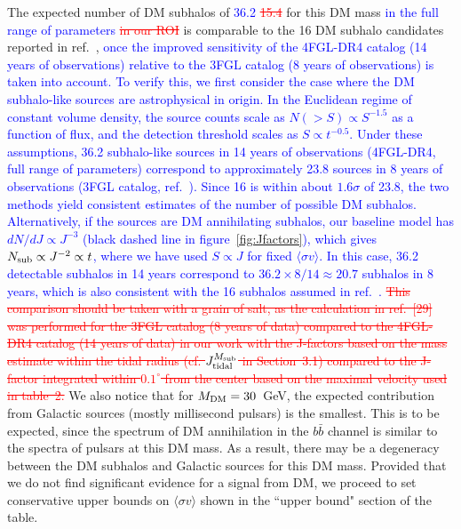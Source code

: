 \documentclass[12pt, a4paper]{article}
\newcommand{\new}[1]{\textcolor{blue}{#1}}
\newcommand{\old}[1]{\textcolor{red}{\st{#1}}}
\newcommand{\sigmav}{\langle \sigma v \rangle}
\newcommand{\Msub}{M_{\rm sub}}
\newcommand{\mdm}{{M_{\rm DM}}}
\begin{document}
The expected number of DM subhalos of \new{36.2} \old{15.4} for this DM mass \new{in the full range of parameters} \old{in our ROI} is comparable to the 16 DM subhalo candidates reported in ref.~\cite{2019JCAP...07..020C},
\new{once the improved sensitivity of the 4FGL-DR4 catalog (14 years of observations) relative to the 3FGL catalog (8 years of observations) is taken into account.}
\new{
To verify this, we first consider the case where the DM subhalo-like sources are astrophysical in origin. In the Euclidean regime of constant volume density, the source counts scale as $N(> S) \propto S^{-1.5}$ as a function of flux, and the detection threshold scales as $S \propto t^{-0.5}$. Under these assumptions, 36.2 subhalo-like sources in 14 years of observations (4FGL-DR4, full range of parameters) correspond to approximately 23.8 sources in 8 years of observations (3FGL catalog, ref.~\cite{2019JCAP...07..020C}).
Since 16 is within about $1.6\sigma$ of 23.8, the two methods yield consistent estimates of the number of possible DM subhalos.}
\new{Alternatively, if the sources are DM annihilating subhalos, our baseline model has $dN/dJ \propto J^{-3}$ (black dashed line in figure~\ref{fig:Jfactors}), which gives $N_{\rm sub} \propto J^{-2} \propto t$, where we have used $S \propto J$ for fixed $\sigmav$.
In this case, 36.2 detectable subhalos in 14 years correspond to $36.2 \times 8 / 14 \approx 20.7$ subhalos in 8 years, which is also consistent with the 16 subhalos assumed in ref.~\cite{2019JCAP...07..020C}.
}
\old{
This comparison should be taken with a grain of salt, as the calculation in ref.~[29] was performed for the 3FGL catalog (8 years of data) compared to the 4FGL-DR4 catalog (14 years of data) in our work with the J-factors based on the mass estimate within the tidal radius (cf. $J_{\rm tidal}^{\Msub}$ in Section~3.1) compared to the J-factor integrated within $0.1^\circ$ from the center based on the maximal velocity used in table~2.}
{We also notice that for $\mdm = 30$~GeV},  the expected contribution from Galactic sources (mostly millisecond pulsars) is the smallest.
This is to be expected, since the spectrum of DM annihilation in the $b\bar{b}$ channel is similar to the spectra of pulsars at this DM mass.
As a result, there may be a degeneracy between the DM subhalos and Galactic sources for this DM mass.
Provided that we do not find significant evidence for a signal from DM, we proceed to set conservative upper bounds on $\sigmav$ shown in the ``upper bound" section of the table.
\end{document}
